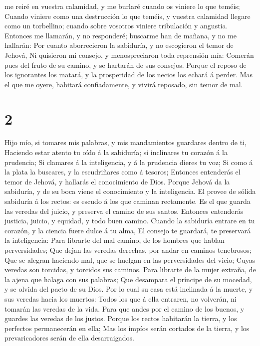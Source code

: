 me reiré en vuestra calamidad, y me burlaré cuando os viniere lo que
teméis;  Cuando viniere como una destrucción lo que
teméis, y vuestra calamidad llegare como un torbellino; cuando sobre
vosotros viniere tribulación y angustia.  Entonces me
llamarán, y no responderé; buscarme han de mañana, y no me hallarán:
 Por cuanto aborrecieron la sabiduría, y no escogieron el
temor de Jehová,  Ni quisieron mi consejo, y
menospreciaron toda reprensión mía:  Comerán pues del
fruto de su camino, y se hartarán de sus consejos. 
Porque el reposo de los ignorantes los matará, y la prosperidad de los
necios los echará á perder.  Mas el que me oyere,
habitará confiadamente, y vivirá reposado, sin temor de mal.

\hypertarget{section-1}{%
\section{2}\label{section-1}}

 Hijo mío, si tomares mis palabras, y mis mandamientos
guardares dentro de ti,  Haciendo estar atento tu oído á
la sabiduría; si inclinares tu corazón á la prudencia;  Si
clamares á la inteligencia, y á la prudencia dieres tu voz;
 Si como á la plata la buscares, y la escudriñares como á
tesoros;  Entonces entenderás el temor de Jehová, y
hallarás el conocimiento de Dios.  Porque Jehová da la
sabiduría, y de su boca viene el conocimiento y la inteligencia.
 El provee de sólida sabiduría á los rectos: es escudo á
los que caminan rectamente.  Es el que guarda las veredas
del juicio, y preserva el camino de sus santos.  Entonces
entenderás justicia, juicio, y equidad, y todo buen camino.
 Cuando la sabiduría entrare en tu corazón, y la ciencia
fuere dulce á tu alma,  El consejo te guardará, te
preservará la inteligencia:  Para librarte del mal
camino, de los hombres que hablan perversidades;  Que
dejan las veredas derechas, por andar en caminos tenebrosos;
 Que se alegran haciendo mal, que se huelgan en las
perversidades del vicio;  Cuyas veredas son torcidas, y
torcidos sus caminos.  Para librarte de la mujer extraña,
de la ajena que halaga con sus palabras;  Que desampara
el príncipe de su mocedad, y se olvida del pacto de su Dios.
 Por lo cual su casa está inclinada á la muerte, y sus
veredas hacia los muertos:  Todos los que á ella
entraren, no volverán, ni tomarán las veredas de la vida.
 Para que andes por el camino de los buenos, y guardes
las veredas de los justos.  Porque los rectos habitarán
la tierra, y los perfectos permanecerán en ella;  Mas los
impíos serán cortados de la tierra, y los prevaricadores serán de ella
desarraigados.

